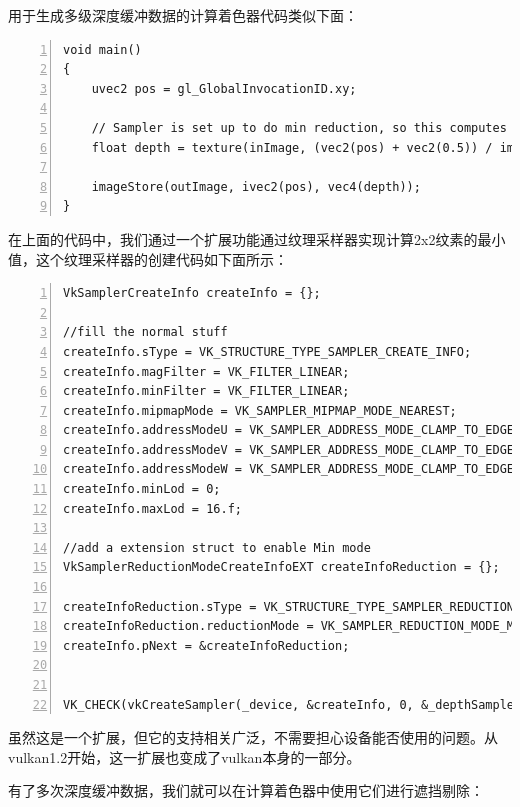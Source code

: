\documentclass{ctexart}
\begin{document}
用于生成多级深度缓冲数据的计算着色器代码类似下面：

\begin{lstlisting}[language={[ANSI]C},keywordstyle=\color{blue!70},commentstyle=\color{red!50!green!50!blue!50},frame=shadowbox, rulesepcolor=\color{red!20!green!20!blue!20},basicstyle=\small,numbers=left, numberstyle=\tiny,breaklines=true]
void main()
{
	uvec2 pos = gl_GlobalInvocationID.xy;

	// Sampler is set up to do min reduction, so this computes the minimum depth of a 2x2 texel quad
	float depth = texture(inImage, (vec2(pos) + vec2(0.5)) / imageSize).x;

	imageStore(outImage, ivec2(pos), vec4(depth));
}
\end{lstlisting}

在上面的代码中，我们通过一个扩展功能通过纹理采样器实现计算2x2纹素的最小值，这个纹理采样器的创建代码如下面所示：

\begin{lstlisting}[language={[ANSI]C},keywordstyle=\color{blue!70},commentstyle=\color{red!50!green!50!blue!50},frame=shadowbox, rulesepcolor=\color{red!20!green!20!blue!20},basicstyle=\small,numbers=left, numberstyle=\tiny,breaklines=true]
VkSamplerCreateInfo createInfo = {};

//fill the normal stuff
createInfo.sType = VK_STRUCTURE_TYPE_SAMPLER_CREATE_INFO;
createInfo.magFilter = VK_FILTER_LINEAR;
createInfo.minFilter = VK_FILTER_LINEAR;
createInfo.mipmapMode = VK_SAMPLER_MIPMAP_MODE_NEAREST;
createInfo.addressModeU = VK_SAMPLER_ADDRESS_MODE_CLAMP_TO_EDGE;
createInfo.addressModeV = VK_SAMPLER_ADDRESS_MODE_CLAMP_TO_EDGE;
createInfo.addressModeW = VK_SAMPLER_ADDRESS_MODE_CLAMP_TO_EDGE;
createInfo.minLod = 0;
createInfo.maxLod = 16.f;

//add a extension struct to enable Min mode
VkSamplerReductionModeCreateInfoEXT createInfoReduction = {};

createInfoReduction.sType = VK_STRUCTURE_TYPE_SAMPLER_REDUCTION_MODE_CREATE_INFO_EXT
createInfoReduction.reductionMode = VK_SAMPLER_REDUCTION_MODE_MIN;
createInfo.pNext = &createInfoReduction;


VK_CHECK(vkCreateSampler(_device, &createInfo, 0, &_depthSampler));
\end{lstlisting}

虽然这是一个扩展，但它的支持相关广泛，不需要担心设备能否使用的问题。从vulkan1.2开始，这一扩展也变成了vulkan本身的一部分。

有了多次深度缓冲数据，我们就可以在计算着色器中使用它们进行遮挡剔除：
\end{document}
